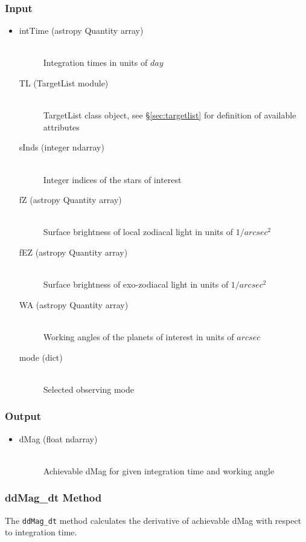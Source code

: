 \documentclass[cleanfoot]{asme2ej}
\begin{document}
\subsubsection*{Input}
\begin{itemize}
\item 
\begin{description}
    \item[intTime (astropy Quantity array)] \hfill \\ Integration times in units of $ day $
    \item[TL (TargetList module)] \hfill \\ TargetList class object, see \S\ref{sec:targetlist} for definition of available attributes
    \item[sInds (integer ndarray)] \hfill \\ Integer indices of the stars of interest
    \item[fZ (astropy Quantity array)] \hfill \\ Surface brightness of local zodiacal light in units of $ 1/arcsec^2 $
    \item[fEZ (astropy Quantity array)] \hfill \\ Surface brightness of exo-zodiacal light in units of $ 1/arcsec^2 $
    \item[WA (astropy Quantity array)] \hfill \\ Working angles of the planets of interest in units of $ arcsec $
    \item[mode (dict)] \hfill \\ Selected observing mode
\end{description}
\end{itemize}
\subsubsection*{Output}
\begin{itemize}
\item 
\begin{description}
    \item[dMag (float ndarray)] \hfill \\ Achievable dMag for given integration time and working angle
\end{description}
\end{itemize}

\subsubsection{ddMag\_dt Method} \label{sec:ddMagdt}
The \verb+ddMag_dt+ method calculates the derivative of achievable dMag with respect to integration time.
\end{document}
